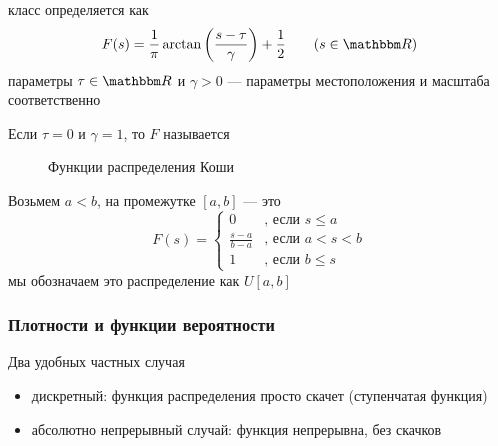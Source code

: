 \begin{frame}

    \Eg
    класс  определяется как 
    \begin{equation*}
        F(s) 
        = \frac{1}{\pi} \arctan\left(  \frac{s - \tau}{\gamma} \right) 
            + \frac{1}{2}
       \qquad (s \in \RR)
    \end{equation*}
    параметры $\tau \in \RR$ и $\gamma > 0$ --- параметры местоположения и масштаба 
    соответственно
    
    Если $\tau=0$ и $\gamma=1$, то $F$ называется

\end{frame}

\begin{frame}

    \begin{figure}
       \begin{center}
        \caption{\label{f:cauchy_cdfs} Функции распределения Коши }
       \end{center}
    \end{figure}
    
\end{frame}

\begin{frame}

    \vspace{2em}
    \Eg
    Возьмем $a < b$,  на промежутке $[a, b]$ --- это
    \begin{equation*}
        F(s) = 
        \begin{cases}
            0 & \text{, если } s \leq a
            \\
            \frac{s-a}{b-a} & \text{, если } a < s < b
            \\
            1   & \text{, если }  b \leq s
        \end{cases}
    \end{equation*}
    мы обозначаем это распределение как $U[a, b]$
        
\end{frame}

\begin{frame}

    \frametitle{Плотности и функции вероятности}

    Два удобных частных случая
    \begin{itemize}
        \item дискретный: функция распределения просто скачет (ступенчатая функция) 
        \item абсолютно непрерывный случай: функция непрерывна, без скачков
    \end{itemize}

\end{frame}

